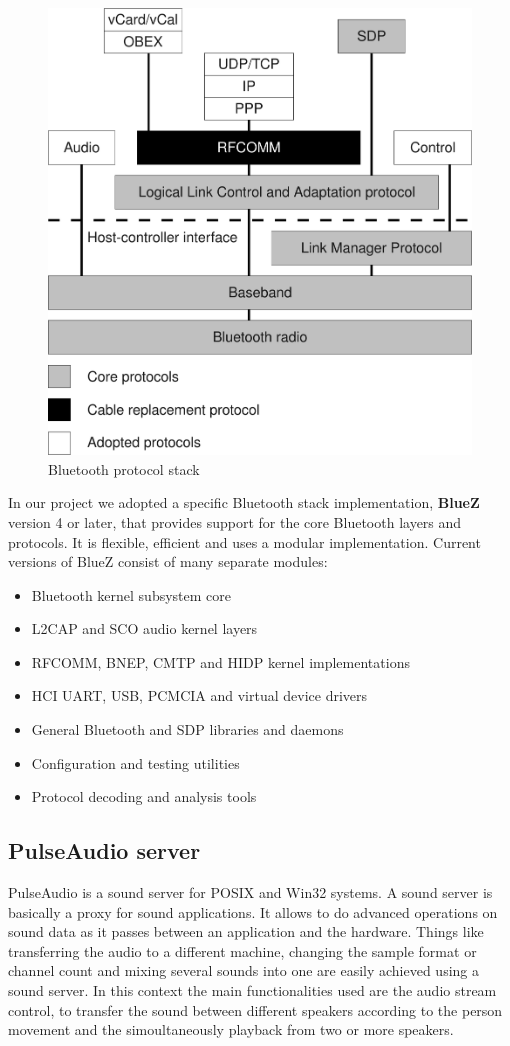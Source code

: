 \documentclass[conference]{IEEEtran}
\begin{document}
\begin{figure}[h]
\centering
\includegraphics[width=0.9\columnwidth]{BTstack}
\caption{Bluetooth protocol stack}
\label{stack}
\end{figure}

In our project we adopted a specific Bluetooth stack implementation, \textbf{BlueZ} version 4 or later, that provides support for the core Bluetooth layers and protocols. It is flexible, efficient and uses a modular implementation. Current versions of BlueZ consist of many separate modules:
\begin{itemize}
\item Bluetooth kernel subsystem core
\item L2CAP and SCO audio kernel layers
\item RFCOMM, BNEP, CMTP and HIDP kernel implementations
\item HCI UART, USB, PCMCIA and virtual device drivers
\item General Bluetooth and SDP libraries and daemons
\item Configuration and testing utilities
\item Protocol decoding and analysis tools
\end{itemize}

\subsection{PulseAudio server}
PulseAudio is a sound server for POSIX and Win32 systems. A sound server is basically a proxy for sound applications. It allows to do advanced operations on sound data as it passes between an application and the hardware. Things like transferring the audio to a different machine, changing the sample format or channel count and mixing several sounds into one are easily achieved using a sound server. In this context the main functionalities used are the audio stream control, to transfer the sound between different speakers according to the person movement and the simoultaneously playback from two or more speakers.
\end{document}
